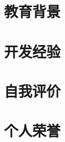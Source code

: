 \documentclass{prometheus_cv}
\begin{document}
\thispagestyle{empty}     %
\pagestyle{fancy}      %

\vspace*{-1cm}
\centering 


\vspace*{0.4cm}
\section{教育背景}


%

\section{开发经验}


\section{自我评价}


\section{个人荣誉}


%


%
\end{document}

